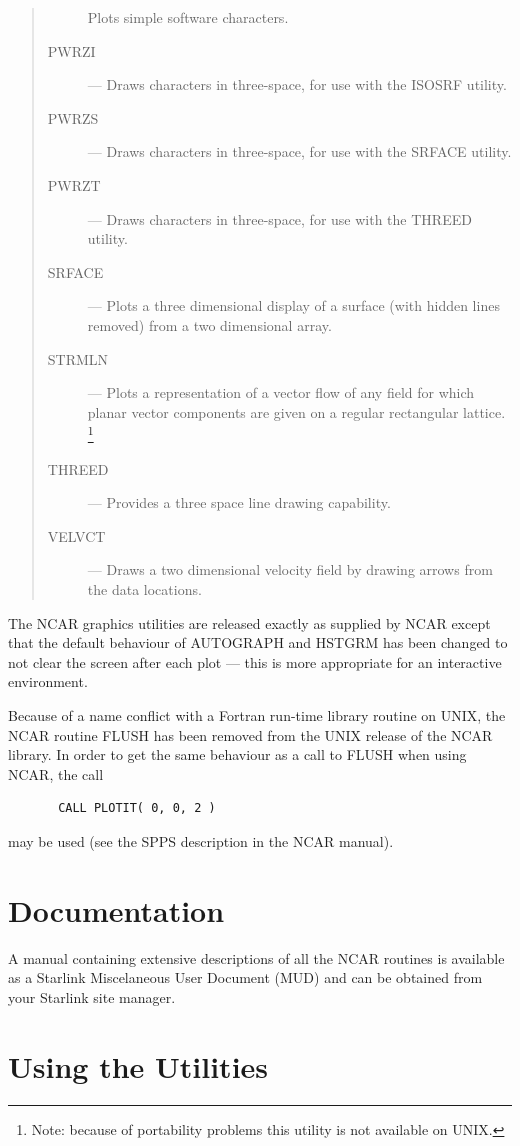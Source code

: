 \documentclass[twoside,11pt]{article}
\newcommand{\xlabel}[1]{}
\renewcommand{\_}{\texttt{\symbol{95}}}
\begin{document}
\begin{quote}
\begin{description}
 Plots simple software characters.
\item [PWRZI] --- 
 Draws characters in three-space, for use with the ISOSRF utility.
\item [PWRZS] --- 
 Draws characters in three-space, for use with the SRFACE utility.
\item [PWRZT] --- 
 Draws characters in three-space, for use with the THREED utility.
\item [SRFACE] --- 
 Plots a three dimensional display of a surface (with hidden lines removed)
 from a two dimensional array.
\item [STRMLN] --- 
 Plots a representation of a vector flow of any field for which planar vector
 components are given on a regular rectangular lattice.
 \footnote{Note: because of portability problems this utility is not available
 on UNIX.}
\item [THREED] --- 
 Provides a three space line drawing capability.
\item [VELVCT] --- 
 Draws a two dimensional velocity field by drawing arrows from the data
 locations.
\end{description}
\end{quote}

The NCAR graphics utilities are released exactly as supplied by NCAR except
that the default behaviour of AUTOGRAPH and HSTGRM has been changed to not
clear the screen after each plot --- this is more appropriate for an
interactive environment. 

Because of a name conflict with a Fortran run-time library routine on
UNIX, the NCAR routine FLUSH has been removed from the UNIX release of
the NCAR library.  In order to get the same behaviour as a call to
FLUSH when using NCAR, the call

\begin{verbatim}
       CALL PLOTIT( 0, 0, 2 )
\end{verbatim}

may be used (see the SPPS description in the NCAR manual).


\section{\xlabel{documentation}Documentation}

A manual containing extensive descriptions of all the NCAR routines
is available as a Starlink Miscelaneous User Document (MUD) and can be 
obtained from your Starlink site manager. 


\section{\xlabel{using_the_utilities}Using the Utilities}
\end{document}
